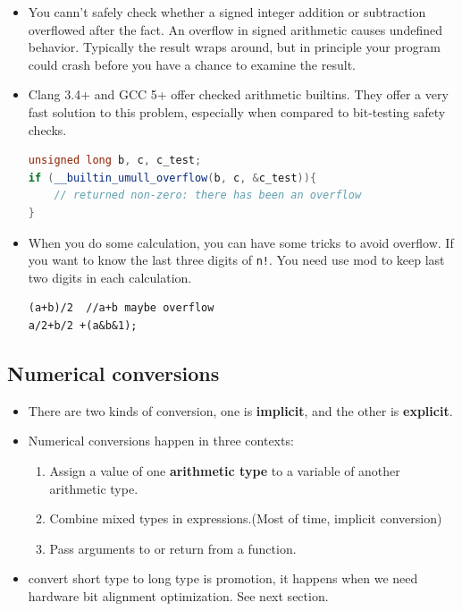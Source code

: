 \documentclass[a4paper,11pt,twoside]{book}
\begin{document}
\begin{itemize}
	\item You cann't safely check whether a signed integer addition or subtraction overflowed after the fact. An overflow in signed arithmetic causes undefined behavior. Typically the result wraps around, but in principle your program could crash before you have a chance to examine the result.
	
	\item Clang 3.4+ and GCC 5+ offer checked arithmetic builtins. They offer a very fast solution to this problem, especially when compared to bit-testing safety checks.
\begin{lstlisting}[frame=single, language=c++]
unsigned long b, c, c_test;
if (__builtin_umull_overflow(b, c, &c_test)){
	// returned non-zero: there has been an overflow
}
\end{lstlisting}
	
\item When you do some calculation, you can have some tricks to avoid overflow. If you  want to know the last three digits of \texttt{n!}. You need use mod to keep last two digits in each calculation.
\begin{lstlisting}[numbers = none]
(a+b)/2  //a+b maybe overflow
a/2+b/2 +(a&b&1);
\end{lstlisting}

\end{itemize}

\subsection{Numerical conversions}

\begin{itemize}
	\item There are two kinds of conversion, one is \textbf{implicit}, and the other is \textbf{explicit}.
	\item Numerical conversions happen in three contexts:
	\begin{enumerate}
		\item Assign a value of one \textbf{arithmetic type} to a variable of another arithmetic type.
		
		\item Combine mixed types in expressions.(Most of time, implicit conversion)
		
		\item Pass arguments to or return from a function.
	\end{enumerate}
	\item convert short type to long type is promotion, it happens when we need hardware bit alignment optimization. See next section. 
\end{itemize}
\end{document}
